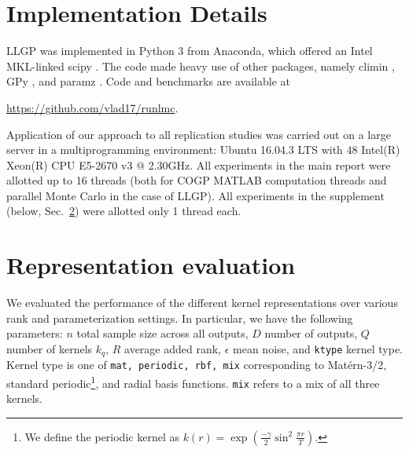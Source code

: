 \documentclass{article}
\newif\ifanonymized
\begin{document}
\ifanonymized

\twocolumn[
\aistatstitle{Supplementary Material for Large Linear Multi-output Gaussian Process Learning}
\aistatsauthor{ Anonymous Author }
\aistatsaddress{ Anonymous Institution }
]
\else
{}
\fi


\section{Implementation Details}

LLGP was implemented in Python 3 from Anaconda, which offered an Intel MKL-linked scipy \citep{scipy}. The code made heavy use of other packages, namely climin \citep{climin}, GPy \citep{gpy}, and paramz \citep{paramz}. Code and benchmarks are available at
\ifanonymized
\texttt{<anonymous repository>}.
\else
\url{https://github.com/vlad17/runlmc}.
\fi

Application of our approach to all replication studies was carried out on a large server in a multiprogramming environment: Ubuntu 16.04.3 LTS with 48 Intel(R) Xeon(R) CPU E5-2670 v3 @ 2.30GHz. All experiments in the main report were allotted up to 16 threads (both for COGP MATLAB computation threads and parallel Monte Carlo in the case of LLGP). All experiments in the supplement (below, Sec.~\ref{empirical-rep}) were allotted only 1 thread each.

\section{Representation evaluation}\label{empirical-rep}

We evaluated the performance of the different kernel representations over various rank and parameterization settings. In particular, we have the following parameters: $n$ total sample size across all outputs, $D$ number of outputs, $Q$ number of kernels $k_q$, $R$ average added rank, $\epsilon$ mean noise, and \texttt{ktype} kernel type. Kernel type is one of \texttt{mat, periodic, rbf, mix} corresponding to Mat\'{e}rn-3/2, standard periodic\footnote{We define the periodic kernel as $k(r) = \exp \left(\frac{-\gamma}{2}\sin^2\frac{\pi r}{T}\right)$.}, and radial basis functions. \texttt{mix} refers to a mix of all three kernels.
\end{document}

